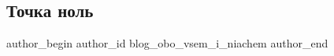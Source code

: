  
 
 
 
 
\subsection{Точка ноль}
\label{sec:13_12_2021.stz.news.ua.vovka.1.tochka_nolj}


\ifcmt
 author_begin
   author_id blog_obo_vsem_i_niachem
 author_end
\fi


